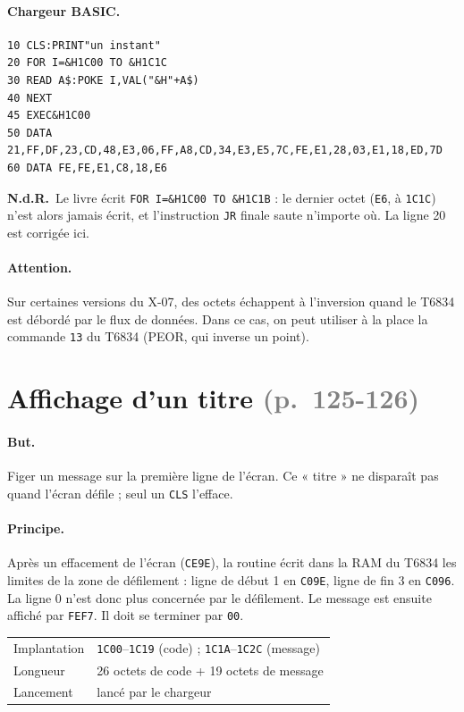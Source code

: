 \documentclass[a4paper,10pt]{article}
\makeatletter
\newcommand{\hex}[1]{\texttt{#1}}
\newcommand{\pg}[1]{\texorpdfstring{\textcolor{gray}{\small(p.~#1)}}{}}
\newcommand{\nota}[1]{\textcolor{red!60!black}{\small\textbf{N.d.R.}~#1}}
\newcommand{\fiche}[3]{%
  \begin{center}\small
  \begin{tabular}{@{}ll@{}}
  \toprule
  Implantation & #1 \\
  Longueur & #2 \\
  Lancement & #3 \\
  \bottomrule
  \end{tabular}
  \end{center}}
\makeatother
\begin{document}
\paragraph{Chargeur BASIC.}
\begin{verbatim}
10 CLS:PRINT"un instant"
20 FOR I=&H1C00 TO &H1C1C
30 READ A$:POKE I,VAL("&H"+A$)
40 NEXT
45 EXEC&H1C00
50 DATA 21,FF,DF,23,CD,48,E3,06,FF,A8,CD,34,E3,E5,7C,FE,E1,28,03,E1,18,ED,7D
60 DATA FE,FE,E1,C8,18,E6
\end{verbatim}
\nota{Le livre écrit \texttt{FOR I=\&H1C00 TO \&H1C1B} : le dernier octet
(\hex{E6}, à \hex{1C1C}) n'est alors jamais écrit, et l'instruction
\texttt{JR} finale saute n'importe où. La ligne 20 est corrigée ici.}

\paragraph{Attention.} Sur certaines versions du X-07, des octets échappent
à l'inversion quand le T6834 est débordé par le flux de données. Dans ce
cas, on peut utiliser à la place la commande \hex{13} du T6834 (PEOR, qui
inverse un point).

\section{Affichage d'un titre \pg{125-126}}

\paragraph{But.} Figer un message sur la première ligne de l'écran. Ce
« titre » ne disparaît pas quand l'écran défile ; seul un \texttt{CLS}
l'efface.

\paragraph{Principe.} Après un effacement de l'écran (\hex{CE9E}), la
routine écrit dans la RAM du T6834 les limites de la zone de défilement :
ligne de début 1 en \hex{C09E}, ligne de fin 3 en \hex{C096}. La ligne 0
n'est donc plus concernée par le défilement. Le message est ensuite affiché
par \hex{FEF7}. Il doit se terminer par \hex{00}.

\fiche{\hex{1C00}--\hex{1C19} (code) ; \hex{1C1A}--\hex{1C2C} (message)}%
      {26 octets de code + 19 octets de message}{lancé par le chargeur}
\end{document}
